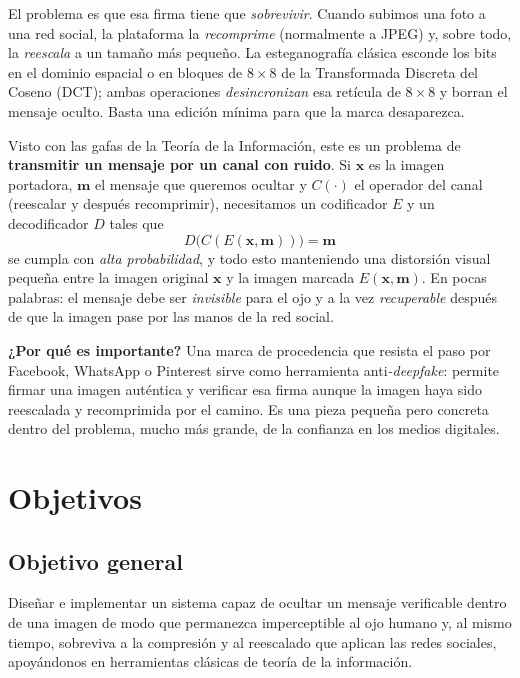 \documentclass[12pt,a4paper]{article}
\newcommand{\vect}[1]{\mathbf{#1}}
\begin{document}
El problema es que esa firma tiene que \emph{sobrevivir}. Cuando subimos una foto a una
red social, la plataforma la \emph{recomprime} (normalmente a JPEG) y, sobre todo, la
\emph{reescala} a un tamaño más pequeño. La esteganografía clásica esconde los bits en
el dominio espacial o en bloques de $8\times 8$ de la Transformada Discreta del Coseno
(DCT); ambas operaciones \emph{desincronizan} esa retícula de $8\times 8$ y borran el
mensaje oculto. Basta una edición mínima para que la marca desaparezca.

Visto con las gafas de la Teoría de la Información, este es un problema de
\textbf{transmitir un mensaje por un canal con ruido}. Si $\vect{x}$ es la imagen
portadora, $\vect{m}$ el mensaje que queremos ocultar y $C(\cdot)$ el operador del canal
(reescalar y después recomprimir), necesitamos un codificador $E$ y un decodificador $D$
tales que
\begin{equation}
D\big(C(E(\vect{x},\vect{m}))\big) = \vect{m}
\end{equation}
se cumpla con \emph{alta probabilidad}, y todo esto manteniendo una distorsión visual
pequeña entre la imagen original $\vect{x}$ y la imagen marcada $E(\vect{x},\vect{m})$.
En pocas palabras: el mensaje debe ser \emph{invisible} para el ojo y a la vez
\emph{recuperable} después de que la imagen pase por las manos de la red social.

\medskip
\noindent\textbf{¿Por qué es importante?} Una marca de procedencia que resista el paso
por Facebook, WhatsApp o Pinterest sirve como herramienta anti\emph{-deepfake}: permite
firmar una imagen auténtica y verificar esa firma aunque la imagen haya sido reescalada y
recomprimida por el camino. Es una pieza pequeña pero concreta dentro del problema, mucho
más grande, de la confianza en los medios digitales.

\section{Objetivos}

\subsection*{Objetivo general}
Diseñar e implementar un sistema capaz de ocultar un mensaje verificable dentro de una
imagen de modo que permanezca imperceptible al ojo humano y, al mismo tiempo, sobreviva a
la compresión y al reescalado que aplican las redes sociales, apoyándonos en herramientas
clásicas de teoría de la información.
\end{document}

